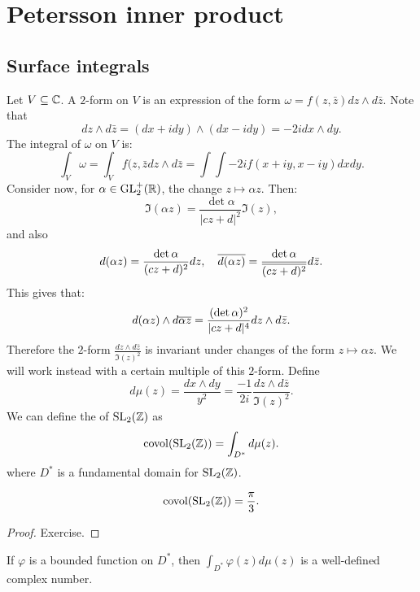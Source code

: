 \section{Petersson inner product}
\subsection{Surface integrals}
Let $V\subseteq \mathbb{C}$. A $2$-form on $V$ is an expression of the form $\omega = f(z,\bar z)dz\wedge d\bar z$. Note that
\[
dz\wedge d\bar z = (dx + i dy)\wedge (dx-idy) = -2idx\wedge dy.
\]
The integral of $\omega$ on $V$ is:
\[
\int_V \omega = \int_V f(z,\bar z dz\wedge d\bar z=\int\int -2i f(x+iy,x-iy)dxdy.
\]
Consider now, for $\alpha\in\operatorname{GL}_2^+(\mathbb{R})$, the change $z\mapsto \alpha z$. Then:
\[
\Im(\alpha z)=\frac{\det \alpha}{|cz+d|^2}\Im(z),
\]
and also
\[
d(\alpha z) = \frac{\operatorname{det} \alpha}{(cz+d)^2} dz,\quad \overline{d(\alpha z)} = \frac{\operatorname{det}\alpha}{\overline{(cz+d)^2}} d\bar z.
\]
This gives that:
\[
d(\alpha z)\wedge d\overline{\alpha z} = \frac{(\operatorname{det} \alpha)^2}{|cz + d|^4} dz\wedge d\bar z.
\]
Therefore the $2$-form $\frac{dz\wedge d\bar z}{\Im(z)^2}$ is invariant under changes of the form $z\mapsto \alpha z$. We will work instead with a certain multiple of this $2$-form. Define
\[
d\mu(z) = \frac{dx\wedge dy}{y^2} = \frac{-1}{2i} \frac{dz\wedge d\bar z}{\Im(z)^2}.
\]
We can define the  of $\operatorname{SL}_2(\mathbb{Z})$ as
\[
\operatorname{covol}(\operatorname{SL}_2(\mathbb{Z})) = \int_{D^*} d\mu(z).
\]
where $D^*$ is a fundamental domain for $\operatorname{SL}_2(\mathbb{Z})$.
\begin{lemma}
  \[\operatorname{covol}(\operatorname{SL}_2(\mathbb{Z})) = \frac{\pi}{3}.\]
\end{lemma}
\begin{proof}
  Exercise.
\end{proof}
\begin{corollary}
  If $\varphi$ is a bounded function on $D^*$, then $\int_{D^*} \varphi(z)d\mu(z)$ is a well-defined complex number.
\end{corollary}

